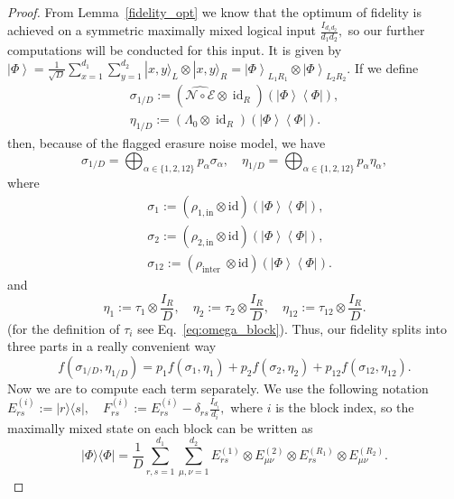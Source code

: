 \documentclass[10pt,twocolumn,superscriptaddress,aps,amsmath,amssymb,citeautoscript,floatfix,prx]{revtex4-2}
\theoremstyle{plain}
\theoremstyle{plain}
\theoremstyle{plain}
\theoremstyle{plain}
\theoremstyle{plain}
\theoremstyle{plain}
\theoremstyle{plain}
\theoremstyle{definition}
\theoremstyle{plain}
\begin{document}
\begin{appendix}
\begin{proof}
From Lemma~\ref{fidelity_opt} we know that the optimum of fidelity is achieved on a symmetric maximally mixed logical input
$
    \frac{I_{d_1 d_2}}{d_1 d_2},
$
so our further computations will be conducted for this input. 
It is given by
$
    \left|\Phi\right\rangle=\frac{1}{\sqrt{D}} \sum_{x=1}^{d_1} \sum_{y=1}^{d_2}|x, y\rangle_L \otimes|x, y\rangle_R=\left|\Phi\right\rangle_{L_1 R_1} \otimes\left|\Phi\right\rangle_{L_2 R_2}.
$
If we define
\[
    \begin{gathered}
    \sigma_{1/D}:=\left(\widehat{\mathcal{N} \circ \mathcal{E}} \otimes \operatorname{id}_R\right)\left(\left|\Phi\right\rangle\left\langle\Phi\right|\right), \\
    \eta_{1/D}:=\left(\Lambda_0 \otimes \operatorname{id}_R\right)\left(\left|\Phi\right\rangle\left\langle\Phi\right|\right) .
    \end{gathered}
\]
then, because of the flagged erasure noise model, we have
\[
    \sigma_{1/D}=\bigoplus_{\alpha \in\{1,2,12\}} p_\alpha \sigma_\alpha, \quad \eta_{1/D}=\bigoplus_{\alpha \in\{1,2,12\}} p_\alpha \eta_\alpha,
\]
where 
\[
    \begin{aligned}
    & \sigma_1:=\left(\rho_{1, \text {in}} \otimes \mathrm{id}\right)\left(\left|\Phi\right\rangle\left\langle\Phi\right|\right), \\
    & \sigma_2:=\left(\rho_{2, \text {in}} \otimes \mathrm{id}\right)\left(\left|\Phi\right\rangle\left\langle\Phi\right|\right), \\
    & \sigma_{12}:=\left(\rho_{\text {inter }}\otimes \mathrm{id}\right)\left(\left|\Phi\right\rangle\left\langle\Phi\right|\right) .
    \end{aligned}
\]
and
\[
    \eta_1:=\tau_1 \otimes \frac{I_R}{D}, \quad \eta_2:=\tau_2 \otimes \frac{I_R}{D}, \quad \eta_{12}:=\tau_{12} \otimes \frac{I_R}{D}.
\]
(for the definition of $\tau_i$ see Eq.~\eqref{eq:omega_block}). Thus, our fidelity splits into three parts in a really convenient way
\[
    f\left(\sigma_{1/D}, \eta_{1/D}\right)=p_1 f\left(\sigma_1, \eta_1\right)+p_2 f\left(\sigma_2, \eta_2\right)+p_{12} f\left(\sigma_{12}, \eta_{12}\right).
\]
Now we are to compute each term separately. We use the following notation
$
    E_{r s}^{(i)}:=|r\rangle\langle s|, \quad F_{r s}^{(i)}:=E_{r s}^{(i)}-\delta_{r s} \frac{I_{d_i}}{d_i},
$ 
where $i$ is the block index, so the maximally mixed state on each block can be written as
$$
    |\Phi\rangle\langle\Phi|=\frac{1}{D} \sum_{r, s=1}^{d_1} \sum_{\mu, \nu=1}^{d_2} E_{r s}^{(1)} \otimes E_{\mu \nu}^{(2)} \otimes E_{r s}^{\left(R_1\right)} \otimes E_{\mu \nu}^{\left(R_2\right)}.
$$
\end{proof}
\end{appendix}
\end{document}
